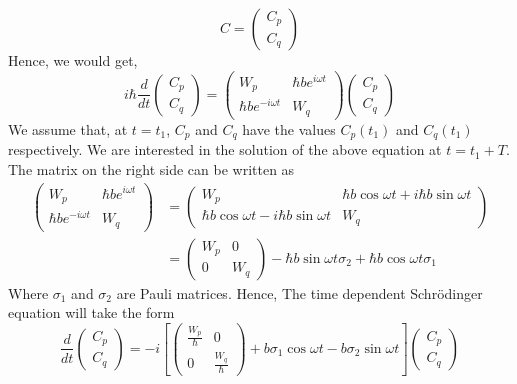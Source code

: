 \begin{equation}
C= \left(
\begin{array}{cc}
C_p \\
C_q
\end{array} \right)
\end{equation}
Hence, we would get,
\begin{equation}
i \hbar \frac{d}{dt}\left(
\begin{array}{cc}
C_p \\
C_q
\end{array} \right) =
\left(
\begin{array}{cc}
W_p & \hbar b e^{i \omega t} \\
\hbar b e^{-i \omega t} & W_q 
\end{array} \right)
\left(
\begin{array}{c}
C_p \\
C_q
\end{array}\right)
\end{equation}
We assume that, at $t=t_1$, $C_p$ and $C_q$ have the values $C_p(t_1)$
and $C_q(t_1)$ respectively. We are interested in the solution of the
above equation at $t=t_1+T$. The matrix on the right side can be
written as
\begin{align}
\left(
\begin{array}{cc}
W_p & \hbar b e^{i\omega t} \\
\hbar b e^{-i\omega t} & W_q 
\end{array}
\right) &=
\left(
\begin{array}{cc}
W_p & \hbar b \cos{\omega t}+i \hbar b \sin{\omega t} \\
\hbar b \cos{\omega t}-i \hbar b \sin{\omega t} & W_q
\end{array}
\right) \\
&= \left(
\begin{array}{cc}
W_p & 0 \\
0 & W_q
\end{array} \right) -\hbar b \sin{\omega t} \sigma_2 +\hbar b \cos{\omega t} \sigma_1
\end{align}
Where $\sigma_1$ and $\sigma_2$ are Pauli matrices. Hence, The time
dependent Schr\"{o}dinger equation will take the form
\begin{equation}
\frac{d}{dt} \left( \begin{array}{c}
C_p \\
C_q
\end{array}\right) =
-i \left[
\left(
\begin{array}{cc}
\frac{W_p}{\hbar} & 0 \\
0 & \frac{W_q}{\hbar}
\end{array}\right)
+ b \sigma_1\cos{\omega t}  -b \sigma_2 \sin{\omega t} 
\right]\left( \begin{array}{c}
C_p \\
C_q
\end{array}\right)
\end{equation}
